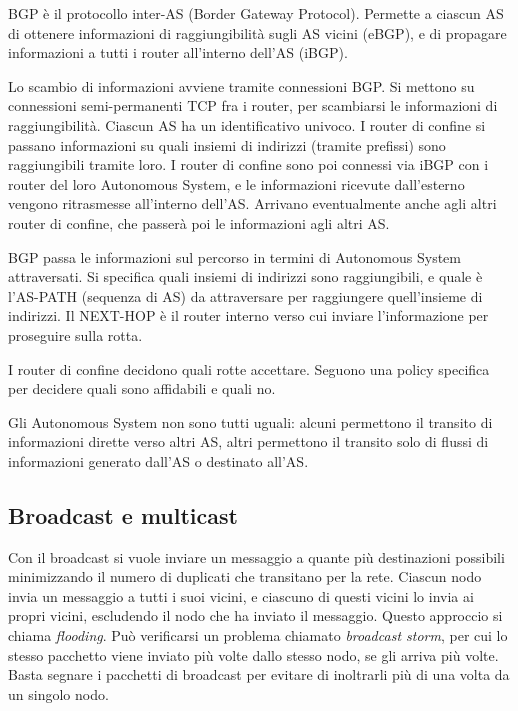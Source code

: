 BGP \`e il protocollo inter-AS (Border Gateway Protocol). Permette a ciascun AS di ottenere informazioni di raggiungibilit\`a sugli AS vicini (eBGP), e di propagare informazioni a tutti i router all'interno dell'AS (iBGP).

Lo scambio di informazioni avviene tramite connessioni BGP. Si mettono su connessioni semi-permanenti TCP fra i router, per scambiarsi le informazioni di raggiungibilit\`a. Ciascun AS ha un identificativo univoco. I router di confine si passano informazioni su quali insiemi di indirizzi (tramite prefissi) sono raggiungibili tramite loro. I router di confine sono poi connessi via iBGP con i router del loro Autonomous System, e le informazioni ricevute dall'esterno vengono ritrasmesse all'interno dell'AS. Arrivano eventualmente anche agli altri router di confine, che passer\`a poi le informazioni agli altri AS.

BGP passa le informazioni sul percorso in termini di Autonomous System attraversati. Si specifica quali insiemi di indirizzi sono raggiungibili, e quale \`e l'AS-PATH (sequenza di AS) da attraversare per raggiungere quell'insieme di indirizzi. Il NEXT-HOP \`e il router interno verso cui inviare l'informazione per proseguire sulla rotta.

I router di confine decidono quali rotte accettare. Seguono una policy specifica per decidere quali sono affidabili e quali no.

Gli Autonomous System non sono tutti uguali: alcuni permettono il transito di informazioni dirette verso altri AS, altri permettono il transito solo di flussi di informazioni generato dall'AS o destinato all'AS.

\subsection{Broadcast e multicast}

Con il broadcast si vuole inviare un messaggio a quante pi\`u destinazioni possibili minimizzando il numero di duplicati che transitano per la rete. Ciascun nodo invia un messaggio a tutti i suoi vicini, e ciascuno di questi vicini lo invia ai propri vicini, escludendo il nodo che ha inviato il messaggio. Questo approccio si chiama \emph{flooding}. Pu\`o verificarsi un problema chiamato \emph{broadcast storm}, per cui lo stesso pacchetto viene inviato pi\`u volte dallo stesso nodo, se gli arriva pi\`u volte. Basta segnare i pacchetti di broadcast per evitare di inoltrarli pi\`u di una volta da un singolo nodo.

